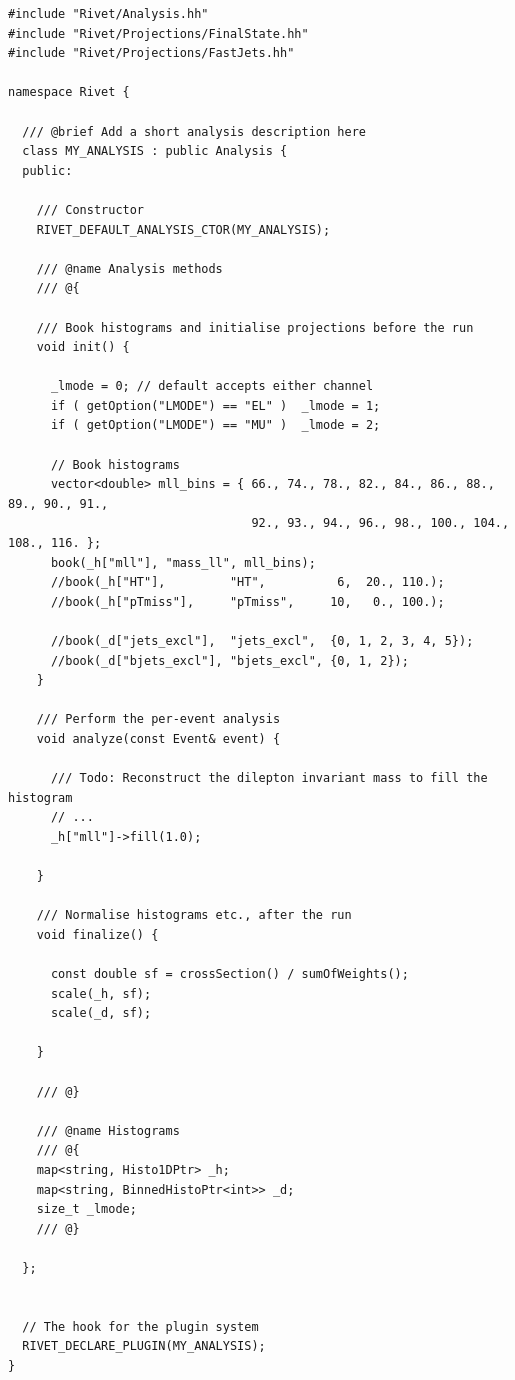 \documentclass[10pt,fleqn]{scrartcl}
\theoremstyle{exstyle}
\begin{document}
\clearpage
\newpage
\begin{footnotesize}
\begin{verbatim}
#include "Rivet/Analysis.hh"
#include "Rivet/Projections/FinalState.hh"
#include "Rivet/Projections/FastJets.hh"

namespace Rivet {

  /// @brief Add a short analysis description here
  class MY_ANALYSIS : public Analysis {
  public:

    /// Constructor
    RIVET_DEFAULT_ANALYSIS_CTOR(MY_ANALYSIS);

    /// @name Analysis methods
    /// @{

    /// Book histograms and initialise projections before the run
    void init() {

      _lmode = 0; // default accepts either channel
      if ( getOption("LMODE") == "EL" )  _lmode = 1;
      if ( getOption("LMODE") == "MU" )  _lmode = 2;

      // Book histograms
      vector<double> mll_bins = { 66., 74., 78., 82., 84., 86., 88., 89., 90., 91.,
                                  92., 93., 94., 96., 98., 100., 104., 108., 116. };
      book(_h["mll"], "mass_ll", mll_bins);
      //book(_h["HT"],         "HT",          6,  20., 110.);
      //book(_h["pTmiss"],     "pTmiss",     10,   0., 100.);

      //book(_d["jets_excl"],  "jets_excl",  {0, 1, 2, 3, 4, 5});
      //book(_d["bjets_excl"], "bjets_excl", {0, 1, 2});
    }

    /// Perform the per-event analysis
    void analyze(const Event& event) {

      /// Todo: Reconstruct the dilepton invariant mass to fill the histogram
      // ...
      _h["mll"]->fill(1.0);

    }

    /// Normalise histograms etc., after the run
    void finalize() {

      const double sf = crossSection() / sumOfWeights();
      scale(_h, sf);
      scale(_d, sf);

    }

    /// @}

    /// @name Histograms
    /// @{
    map<string, Histo1DPtr> _h;
    map<string, BinnedHistoPtr<int>> _d;
    size_t _lmode;
    /// @}

  };


  // The hook for the plugin system
  RIVET_DECLARE_PLUGIN(MY_ANALYSIS);
}
\end{verbatim}
\end{footnotesize}
\clearpage
\newpage
\end{document}
